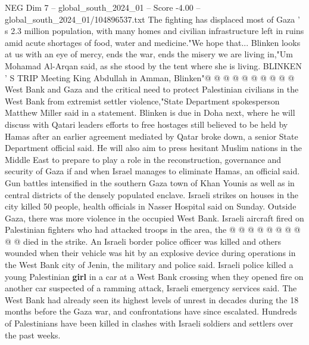 \begin{textsample}{NEG Dim 7 – global\_south\_2024\_01 – Score -4.00 – global\_south\_2024\_01/104896537.txt}
The fighting has displaced most of Gaza ' s 2.3 million population, with many homes and civilian infrastructure left in ruins amid acute shortages of food, water and medicine."We hope that...
Blinken looks at us with an eye of mercy, ends the war, ends the misery we are living in,"Um Mohamad Al-Arqan said, as she stood by the tent where she is living.
BLINKEN ' S TRIP Meeting King Abdullah in Amman, Blinken"@ @ @ @ @ @ @ @ @ @ West Bank and Gaza and the critical need to protect Palestinian civilians in the West Bank from extremist settler violence,"State Department spokesperson Matthew Miller said in a statement.
Blinken is due in Doha next, where he will discuss with Qatari leaders efforts to free hostages still believed to be held by Hamas after an earlier agreement mediated by Qatar broke down, a senior State Department official said.
He will also aim to press hesitant Muslim nations in the Middle East to prepare to play a role in the reconstruction, governance and security of Gaza if and when Israel manages to eliminate Hamas, an official said.
Gun battles intensified in the southern Gaza town of Khan Younis as well as in central districts of the densely populated enclave.
Israeli strikes on houses in the city killed 50 people, health officials in Nasser Hospital said on Sunday.
Outside Gaza, there was more violence in the occupied West Bank.
Israeli aircraft fired on Palestinian fighters who had attacked troops in the area, the @ @ @ @ @ @ @ @ @ @ died in the strike.
An Israeli border police officer was killed and others wounded when their vehicle was hit by an explosive device during operations in the West Bank city of Jenin, the military and police said.
Israeli police killed a young Palestinian \textbf{girl} in a car at a West Bank crossing when they opened fire on another car suspected of a ramming attack, Israeli emergency services said.
The West Bank had already seen its highest levels of unrest in decades during the 18 months before the Gaza war, and confrontations have since escalated.
Hundreds of Palestinians have been killed in clashes with Israeli soldiers and settlers over the past weeks.

\end{textsample}
